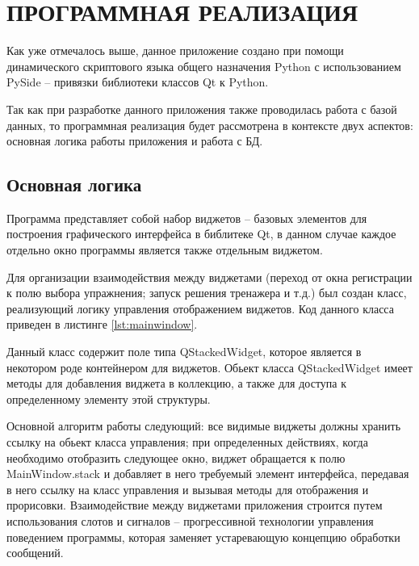 \section{ПРОГРАММНАЯ РЕАЛИЗАЦИЯ}
\label{sec:program-implementation}

\vspace{0.6cm}

Как уже отмечалось выше, данное приложение создано при помощи динамического скриптового языка общего назначения 
Python с использованием PySide -- привязки библиотеки классов Qt к Python.

Так как при разработке данного приложения также проводилась работа с базой данных, то программная реализация будет
рассмотрена в контексте двух аспектов: основная логика работы приложения и работа с БД.

\subsection{Основная логика}
\label{sec:main}

Программа представляет собой набор виджетов -- базовых элементов для построения графического интерфейса в библитеке
Qt, в данном случае каждое отдельно окно программы является также отдельным виджетом.

Для организации взаимодействия между виджетами (переход от окна регистрации к полю выбора упражнения; запуск решения
тренажера и т.д.) был создан класс, реализующий логику управления отображением виджетов. Код данного класса приведен
в листинге \ref{lst:mainwindow}.



Данный класс содержит поле типа QStackedWidget, которое является в некотором роде контейнером для виджетов. Обьект 
класса QStackedWidget имеет методы для добавления виджета в коллекцию, а также для доступа к определенному элементу
этой структуры.

Основной алгоритм работы следующий: все видимые виджеты должны хранить ссылку на обьект класса управления; при 
определенных действиях, когда необходимо отобразить следующее окно, виджет обращается к полю MainWindow.stack и 
добавляет в него требуемый элемент интерфейса, передавая в него ссылку на класс управления и вызывая 
методы для отображения и прорисовки. Взаимодействие между виджетами приложения строится путем использования слотов и 
сигналов -- прогрессивной технологии управления поведением программы, которая заменяет устаревающую концепцию обработки
сообщений.


